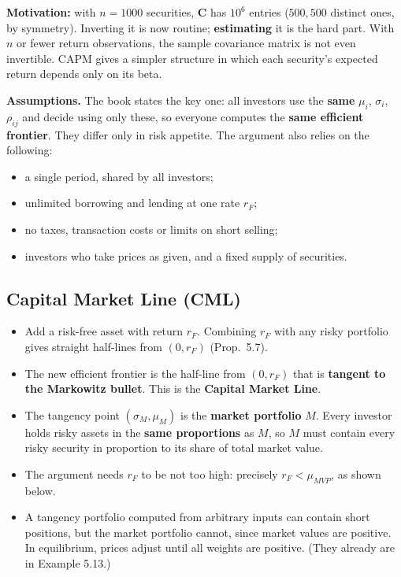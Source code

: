 \documentclass[titlepage,11pt,a4paper]{article}
\newcommand{\vC}{\boldsymbol{C}}
\begin{document}
\textbf{Motivation:} with $n=1000$ securities, $\vC$ has $10^6$ entries ($500{,}500$ distinct ones, by symmetry). Inverting it is now routine; \textbf{estimating} it is the hard part. With $n$ or fewer return observations, the sample covariance matrix is not even invertible. CAPM gives a simpler structure in which each security's expected return depends only on its beta.

\textbf{Assumptions.} The book states the key one: all investors use the \textbf{same} $\mu_i$, $\sigma_i$, $\rho_{ij}$ and decide using only these, so everyone computes the \textbf{same efficient frontier}. They differ only in risk appetite. The argument also relies on the following:
\begin{itemize}
  \item a single period, shared by all investors;
  \item unlimited borrowing and lending at one rate $r_F$;
  \item no taxes, transaction costs or limits on short selling;
  \item investors who take prices as given, and a fixed supply of securities.
\end{itemize}

\subsection{Capital Market Line (CML)}
\begin{itemize}
  \item Add a risk-free asset with return $r_F$. Combining $r_F$ with any risky portfolio gives straight half-lines from $(0,r_F)$ (Prop.\ 5.7).
  \item The new efficient frontier is the half-line from $(0,r_F)$ that is \textbf{tangent to the Markowitz bullet}. This is the \textbf{Capital Market Line}.
  \item The tangency point $(\sigma_M,\mu_M)$ is the \textbf{market portfolio} $M$. Every investor holds risky assets in the \textbf{same proportions} as $M$, so $M$ must contain every risky security in proportion to its share of total market value.
  \item The argument needs $r_F$ to be not too high: precisely $r_F<\mu_{MVP}$, as shown below.
  \item A tangency portfolio computed from arbitrary inputs can contain short positions, but the market portfolio cannot, since market values are positive. In equilibrium, prices adjust until all weights are positive. (They already are in Example 5.13.)
\end{itemize}
\end{document}
